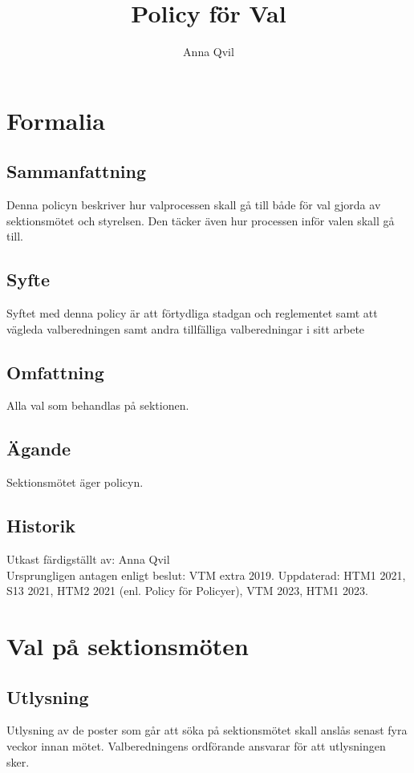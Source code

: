 \documentclass{dsekprotokoll}
\title{Policy för Val}
\author{Anna Qvil}
\begin{document}
\maketitle
\section{Formalia}
\subsection{Sammanfattning}
Denna policyn beskriver hur valprocessen skall gå till både för val gjorda av sektionsmötet och styrelsen. Den täcker även hur processen inför valen skall gå till.

\subsection{Syfte}
Syftet med denna policy är att förtydliga stadgan och reglementet samt att vägleda valberedningen samt andra tillfälliga valberedningar i sitt arbete

\subsection{Omfattning}
Alla val som behandlas på sektionen.

\subsection{Ägande}
Sektionsmötet äger policyn.

\subsection{Historik}
Utkast färdigställt av: Anna Qvil \\
Ursprungligen antagen enligt beslut: VTM extra 2019.
Uppdaterad: HTM1 2021, S13 2021, HTM2 2021 (enl. Policy för Policyer), VTM 2023, HTM1 2023.


\section{Val på sektionsmöten}

\subsection{Utlysning}
Utlysning av de poster som går att söka på sektionsmötet skall anslås senast fyra veckor innan mötet. Valberedningens ordförande ansvarar för att utlysningen sker.
\end{document}
